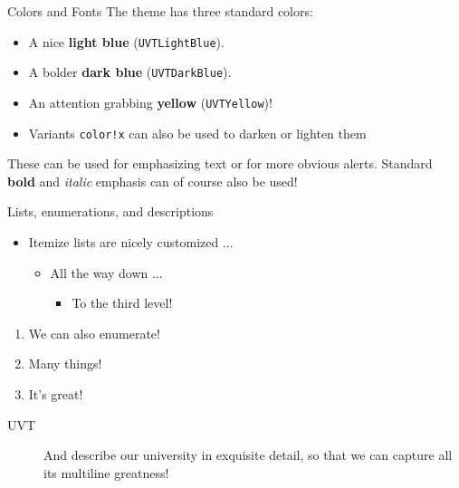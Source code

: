 \documentclass[final]{beamer}
\begin{document}
\begin{frame}[fragile]
\begin{columns}[t]
\begin{column}{0.3\paperwidth}
\begin{block}{Colors and Fonts}
    \bigskip
    The theme has three standard colors:
    \begin{itemize}
        \item A nice \textcolor{UVTLightBlue}{\textbf{light blue}} (\texttt{UVTLightBlue}).
        \item A bolder \textcolor{UVTDarkBlue}{\textbf{dark blue}} (\texttt{UVTDarkBlue}).
        \item An attention grabbing \textcolor{UVTYellow}{\textbf{yellow}}
        (\texttt{UVTYellow})!
        \item Variants \texttt{color!x} can also be used to darken or lighten them
    \end{itemize}

    \bigskip
    These can be used for emphasizing \textcolor{UVTLightBlue}{text} or for
    more obvious \alert{alerts}. Standard \textbf{bold} and \textit{italic} emphasis
    can of course also be used!
\end{block}

\begin{alertblock}{Lists, enumerations, and descriptions}

\begin{itemize}
    \item Itemize lists are nicely customized ...
    \begin{itemize}
        \item All the way down ...
        \begin{itemize}
            \item To the third level!
        \end{itemize}
    \end{itemize}
\end{itemize}


\begin{enumerate}
    \item We can also enumerate!
    \item Many things!
    \item It's great!
\end{enumerate}


\begin{description}
    \item[UVT] And describe our university in exquisite detail, so that we
        can capture all its multiline greatness!
\end{description}
\end{alertblock}
\end{column}


\end{columns}
\end{frame}
\end{document}
